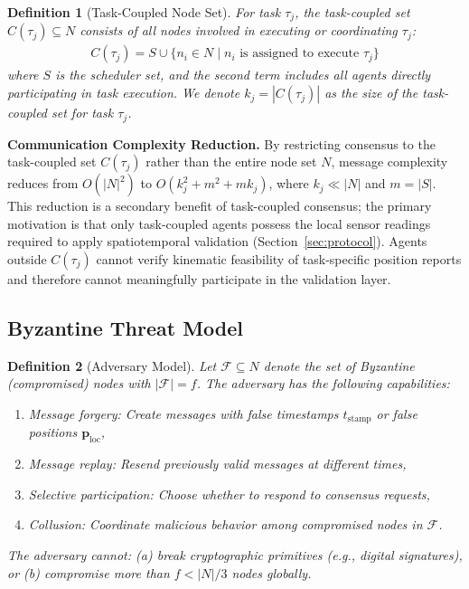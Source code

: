 \documentclass[manuscript,screen,review]{acmart}
\newtheorem{definition}{Definition}
\begin{document}
\begin{definition}[Task-Coupled Node Set]
\label{def:task_coupled_set}
For task $\tau_j$, the \textit{task-coupled set} $C(\tau_j) \subseteq N$ consists of all nodes involved in executing or coordinating $\tau_j$:
\begin{equation}
\begin{aligned}
C(\tau_j) = S \cup \{n_i \in N \mid n_i \text{ is assigned to execute } \tau_j\}
\end{aligned}
\end{equation}
where $S$ is the scheduler set, and the second term includes all agents directly participating in task execution. We denote $k_j = |C(\tau_j)|$ as the size of the task-coupled set for task $\tau_j$.
\end{definition}

\textbf{Communication Complexity Reduction.}
By restricting consensus to the task-coupled set $C(\tau_j)$ rather than the entire node set $N$, message complexity reduces from $O(|N|^2)$ to $O(k_j^2 + m^2 + mk_j)$, where $k_j \ll |N|$ and $m = |S|$. This reduction is a secondary benefit of task-coupled consensus; the primary motivation is that only task-coupled agents possess the local sensor readings required to apply spatiotemporal validation (Section~\ref{sec:protocol}). Agents outside $C(\tau_j)$ cannot verify kinematic feasibility of task-specific position reports and therefore cannot meaningfully participate in the validation layer.

\subsection{Byzantine Threat Model}
\label{sec:threat_model}

\begin{definition}[Adversary Model]
\label{def:adversary}
Let $\mathcal{F} \subseteq N$ denote the set of Byzantine (compromised) nodes with $|\mathcal{F}| = f$. The adversary has the following capabilities:
\begin{enumerate}
    \item \textit{Message forgery}: Create messages with false timestamps $t_{\text{stamp}}$ or false positions $\mathbf{p}_{\text{loc}}$,
    \item \textit{Message replay}: Resend previously valid messages at different times,
    \item \textit{Selective participation}: Choose whether to respond to consensus requests,
    \item \textit{Collusion}: Coordinate malicious behavior among compromised nodes in $\mathcal{F}$.
\end{enumerate}
The adversary \textit{cannot}: (a) break cryptographic primitives (e.g., digital signatures), or (b) compromise more than $f < |N|/3$ nodes globally.
\end{definition}
\end{document}
